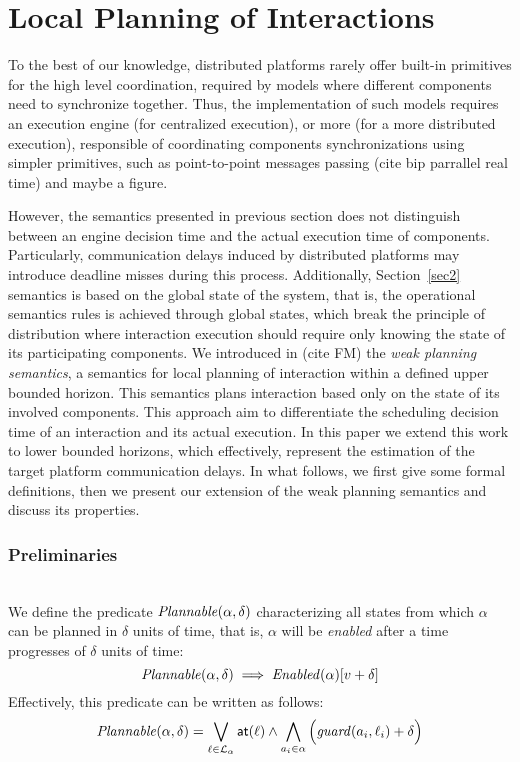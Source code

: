 \section{Local Planning of Interactions}
\label{sec3}
To the best of our knowledge, distributed platforms rarely offer built-in primitives
for the high level coordination, required by models where different components
need to synchronize together. Thus, the implementation of such models requires
an execution engine (for centralized execution), or more (for a more distributed execution),
responsible of coordinating components synchronizations using simpler primitives,
such as point-to-point messages passing (cite bip parrallel real time) and maybe a figure.

However, the semantics presented in previous section does not distinguish between 
an engine decision time and the actual execution time of components.
Particularly, communication delays induced by distributed platforms may introduce 
deadline misses during this process.
Additionally, Section~\ref{sec2} semantics is based on the global state of the system,
that is, the operational semantics rules is achieved through global states, which
break the principle of distribution where interaction execution should require only 
knowing the state of its participating components. 
We introduced in (cite FM) the \emph{weak planning semantics}, a semantics for local
planning of interaction within a defined upper bounded horizon. This semantics plans interaction based only on
the state of its involved components. This approach aim to differentiate the scheduling decision 
time of an interaction and its actual execution. In this paper we extend this work to lower bounded
horizons, which effectively, represent the estimation of the target platform communication
delays. In what follows, we first give some formal definitions, then we present our extension of
the weak planning semantics and discuss its properties.

\subsubsection*{Preliminaries}\label{subsec:wp}\mbox{}\\ 
We define the predicate $\mathit{Plannable(\alpha,\delta)}$ characterizing all states
  from which $\alpha$ can be planned in $\delta$ units of time, that is, 
  $\alpha$ will be \emph{enabled} after a time progresses of $\delta$ units of time:
  \begin{equation}\label{eq:enf1}
    \mathit{Plannable(\alpha,\delta)}\implies\mathit{Enabled}(\alpha)[v+\delta]   
  \end{equation}
 Effectively, this predicate can be written as follows: 
  \begin{equation}\label{eq:enf2}
    \mathit{Plannable(\alpha,\delta)}=\bigvee_{\ell\in\mathcal{L}_{\alpha}} \textnormal{\textsf{at}}(\ell)\wedge\bigwedge_{a_i\in\alpha} \Big(\mathit{guard}(a_i,\ell_i)+\delta\Big)
\end{equation}

